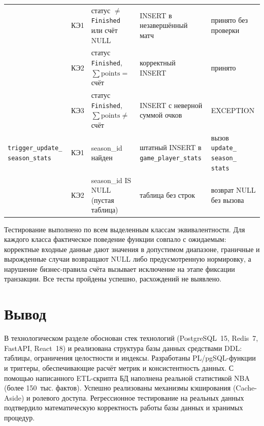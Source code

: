 \begin{table}[H]
\begin{tabular}{|>{\raggedright\arraybackslash}p{}|c|>{\raggedright\arraybackslash}p{}|>{\raggedright\arraybackslash}p{}|>{\raggedright\arraybackslash}p{}|}
 & КЭ1 & статус $\neq$ \texttt{Finished} или счёт NULL & INSERT в незавершённый матч & принято без проверки \\
 & КЭ2 & статус \texttt{Finished}, $\sum\mathrm{points} =$ счёт & корректный INSERT & принято \\
 & КЭ3 & статус \texttt{Finished}, $\sum\mathrm{points} \neq$ счёт & INSERT с неверной суммой очков & EXCEPTION \\
\hline
\texttt{trigger\_update\_} \texttt{season\_stats}
 & КЭ1 & season\_id найден & штатный INSERT в \texttt{game\_player\_stats} & вызов \texttt{update\_} \texttt{season\_} \texttt{stats} \\
 & КЭ2 & season\_id IS NULL (пустая таблица) & таблица без строк & возврат NULL без вызова \\
\hline
\end{tabular}
\end{table}

Тестирование выполнено по всем выделенным классам эквивалентности.
Для каждого класса фактическое поведение функции совпало с ожидаемым:
корректные входные данные дают значения в допустимом диапазоне, граничные
и вырожденные случаи возвращают NULL либо предусмотренную нормировку,
а нарушение бизнес-правила счёта вызывает исключение на этапе фиксации
транзакции. Все тесты пройдены успешно, расхождений не выявлено.

\section*{Вывод}

В технологическом разделе обоснован стек технологий (PostgreSQL~15,
Redis~7, FastAPI, React~18) и реализована структура базы данных средствами
DDL: таблицы, ограничения целостности и индексы.
Разработаны PL/pgSQL-функции и триггеры, обеспечивающие расчёт метрик и
консистентность данных. С помощью написанного ETL-скрипта БД наполнена
реальной статистикой NBA (более 150~тыс. фактов). Успешно реализованы
механизмы кэширования (Cache-Aside) и ролевого доступа. Регрессионное
тестирование на реальных данных подтвердило математическую корректность
работы базы данных и хранимых процедур.